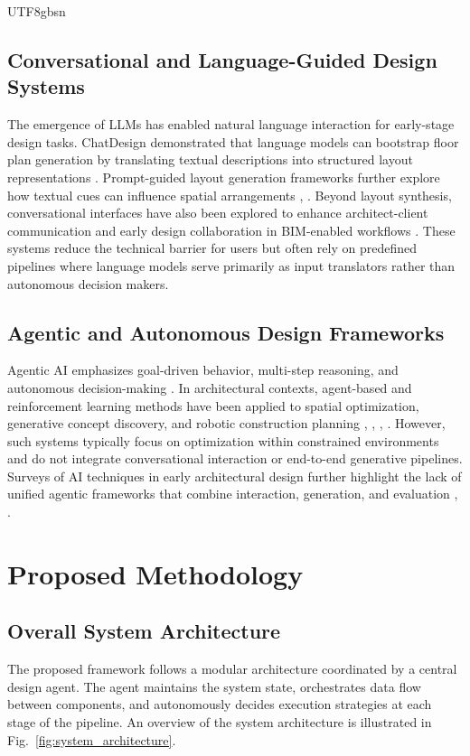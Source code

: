 \documentclass[11pt]{article}
\let\cite\citep
\providecommand\citep{\cite}
\begin{document}
\begin{CJK}{UTF8}{gbsn}
\subsection*{Conversational and Language-Guided Design Systems}

The emergence of LLMs has enabled natural language interaction for early-stage design tasks. ChatDesign demonstrated that language models can bootstrap floor plan generation by translating textual descriptions into structured layout representations \cite{b1}. Prompt-guided layout generation frameworks further explore how textual cues can influence spatial arrangements \cite{b5}, \cite{b20}. Beyond layout synthesis, conversational interfaces have also been explored to enhance architect-client communication and early design collaboration in BIM-enabled workflows \cite{b9}. These systems reduce the technical barrier for users but often rely on predefined pipelines where language models serve primarily as input translators rather than autonomous decision makers.

\subsection*{Agentic and Autonomous Design Frameworks}

Agentic AI emphasizes goal-driven behavior, multi-step reasoning, and autonomous decision-making \cite{b21}. In architectural contexts, agent-based and reinforcement learning methods have been applied to spatial optimization, generative concept discovery, and robotic construction planning \cite{b6}, \cite{b7}, \cite{b11}, \cite{b12}. However, such systems typically focus on optimization within constrained environments and do not integrate conversational interaction or end-to-end generative pipelines. Surveys of AI techniques in early architectural design further highlight the lack of unified agentic frameworks that combine interaction, generation, and evaluation \cite{b10}, \cite{b13}.

\section*{Proposed Methodology}

\subsection*{Overall System Architecture}

The proposed framework follows a modular architecture coordinated by a central design agent. The agent maintains the system state, orchestrates data flow between components, and autonomously decides execution strategies at each stage of the pipeline. An overview of the system architecture is illustrated in Fig.~\ref{fig:system_architecture}.


\end{CJK}
\end{document}

